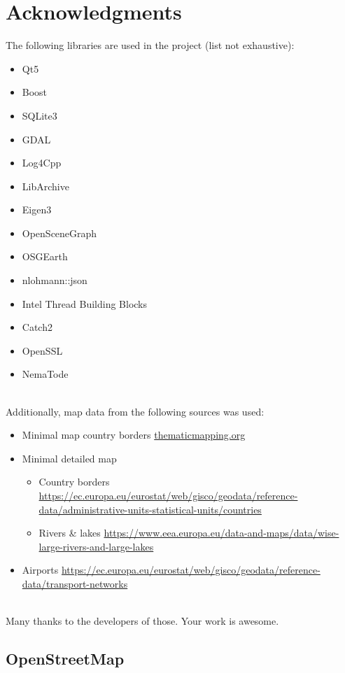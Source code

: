  \section{Acknowledgments}

The following libraries are used in the project (list not exhaustive):

\begin{itemize}  
\item Qt5
\item Boost
\item SQLite3
\item GDAL
\item Log4Cpp
\item LibArchive
\item Eigen3
\item OpenSceneGraph
\item OSGEarth
\item nlohmann::json
\item Intel Thread Building Blocks
\item Catch2
\item OpenSSL
\item NemaTode
\end{itemize}
\ \\

Additionally, map data from the following sources was used:
\begin{itemize}  
\item Minimal map country borders \url{thematicmapping.org}
\item Minimal detailed map
\begin{itemize} 
\item Country borders \url{https://ec.europa.eu/eurostat/web/gisco/geodata/reference-data/administrative-units-statistical-units/countries}
\item Rivers \& lakes \url{https://www.eea.europa.eu/data-and-maps/data/wise-large-rivers-and-large-lakes}
\end{itemize}
\item Airports \url{https://ec.europa.eu/eurostat/web/gisco/geodata/reference-data/transport-networks}
\end{itemize}
\ \\

Many thanks to the developers of those. Your work is awesome.

\subsection{OpenStreetMap}

